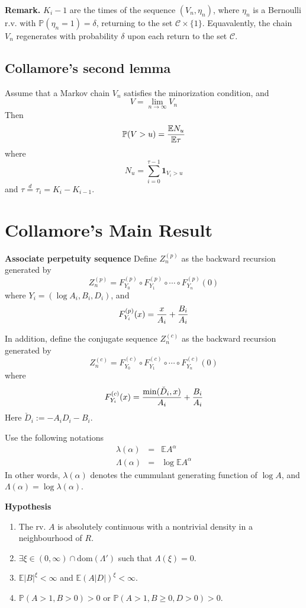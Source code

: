 \documentclass[12pt]{article}
\newcommand{\E}{
        \mathbb{E}
}
\newcommand{\p}{
        \mathbb{P}
}
\newcommand{\I}[1]{
        \mathbf 1_{#1}
}
\newcommand{\dom}{
        \text{dom}
}
\begin{document}
{\bf Remark. } $K_i-1$ are the times of the sequence $(V_n, \eta_n)$, where
$\eta_n$ is a Bernoulli r.v. with $\p(\eta_n = 1) = \delta$, returning to
the set $\mathcal C \times \{1\}$. Equavalently, the chain $V_n$ regenerates
with probability $\delta$ upon each return to the set $\mathcal C$.

\subsection{Collamore's second lemma}
Assume that a Markov chain $V_n$ satisfies the minorization condition, and
\[
        V = \lim_{n \to \infty} V_n
\]
Then
\[
\p(V > u) = {\E N_u \over \E \tau}
\]
where
\[
        N_u = \sum_{i=0}^{\tau - 1} \I{V_i > u}
\]
and $\tau \overset{d}{=} \tau_i = K_i - K_{i-1}$.

\section{Collamore's Main Result}
{\bf Associate perpetuity sequence}
Define $Z^{(p)}_n$ as the backward recursion generated by
\[
Z^{(p)}_n = F^{(p)}_{Y_0} \circ F^{(p)}_{Y_1} \circ \cdots
\circ F^{(p)}_{Y_n}(0)
\]
where $Y_i = (\log A_i, B_i, D_i)$, and
\[
F^{(p)}_{Y_i}(x) = {x \over A_i} + {B_i \over A_i}
\]

In addition, define the conjugate sequence $Z^{(c)}_n$ as
the backward recursion generated by
\[
Z^{(c)}_n = F^{(c)}_{Y_0} \circ F^{(c)}_{Y_1} \circ \cdots
\circ F^{(c)}_{Y_n}(0)
\]
where
\[
F^{(c)}_{Y_i}(x) = {\min(\check D_i, x) \over A_i} + {B_i \over A_i}
\]
Here $\check D_i := -A_i D_i - B_i$.

Use the following notations
\begin{eqnarray*}
\lambda(\alpha) &=& \E A^\alpha \\
\Lambda(\alpha) &=& \log \E A^\alpha
\end{eqnarray*}
In other words, $\lambda(\alpha)$ denotes the cummulant generating
function of $\log A$, and $\Lambda(\alpha) = \log \lambda(\alpha)$.

{\bf Hypothesis}
\begin{enumerate}
\item The rv. $A$ is absolutely continuous with a nontrivial
      density in a neighbourhood of $R$.
\item $\exists \xi \in (0, \infty) \cap \dom(\Lambda')$ such that
      $\Lambda(\xi) = 0$.
\item $\E|B|^\xi < \infty$ and $\E(A|D|)^\xi < \infty$.
\item $\p(A > 1, B > 0) > 0$ or $\p(A > 1, B \geq 0, D > 0) > 0$.
\end{enumerate}
\end{document}
